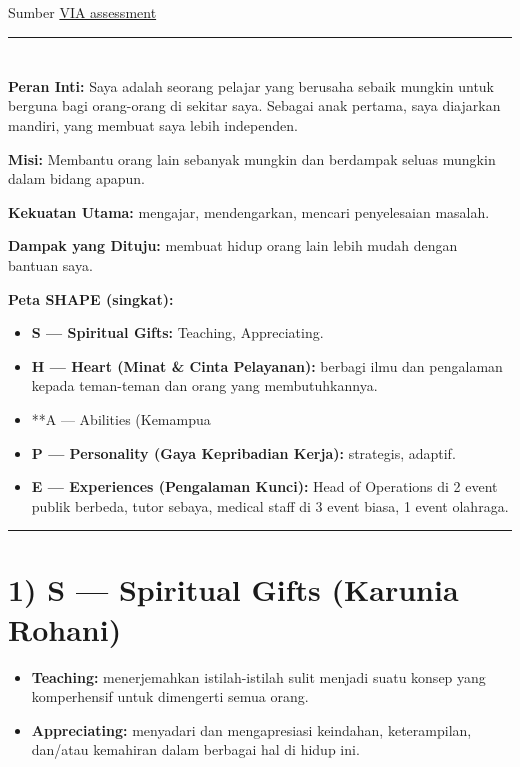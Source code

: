 \documentclass[
  letterpaper,
  DIV=11,
  numbers=noendperiod]{scrreprt}
\providecommand{\tightlist}{%
  \setlength{\itemsep}{0pt}\setlength{\parskip}{0pt}}\usepackage{longtable,booktabs,array}
\begin{document}
Sumber \href{pn.pdf}{VIA assessment}

\begin{center}\rule{0.5\linewidth}{0.5pt}\end{center}

\section{}\label{section}

\textbf{Peran Inti:} Saya adalah seorang pelajar yang berusaha sebaik
mungkin untuk berguna bagi orang-orang di sekitar saya. Sebagai anak
pertama, saya diajarkan mandiri, yang membuat saya lebih independen.

\textbf{Misi:} Membantu orang lain sebanyak mungkin dan berdampak seluas
mungkin dalam bidang apapun.

\textbf{Kekuatan Utama:} mengajar, mendengarkan, mencari penyelesaian
masalah.

\textbf{Dampak yang Dituju:} membuat hidup orang lain lebih mudah dengan
bantuan saya.

\textbf{Peta SHAPE (singkat):}

\begin{itemize}
\tightlist
\item
  \textbf{S --- Spiritual Gifts:} Teaching, Appreciating.
\item
  \textbf{H --- Heart (Minat \& Cinta Pelayanan):} berbagi ilmu dan
  pengalaman kepada teman-teman dan orang yang membutuhkannya.
\item
  **A --- Abilities (Kemampua
\item
  \textbf{P --- Personality (Gaya Kepribadian Kerja):} strategis,
  adaptif.
\item
  \textbf{E --- Experiences (Pengalaman Kunci):} Head of Operations di 2
  event publik berbeda, tutor sebaya, medical staff di 3 event biasa, 1
  event olahraga.
\end{itemize}

\begin{center}\rule{0.5\linewidth}{0.5pt}\end{center}

\section{1) S --- Spiritual Gifts (Karunia
Rohani)}\label{s-spiritual-gifts-karunia-rohani}

\begin{itemize}
\item
  \textbf{Teaching:} menerjemahkan istilah-istilah sulit menjadi suatu
  konsep yang komperhensif untuk dimengerti semua orang.
\item
  \textbf{Appreciating:} menyadari dan mengapresiasi keindahan,
  keterampilan, dan/atau kemahiran dalam berbagai hal di hidup ini.
\end{itemize}
\end{document}
